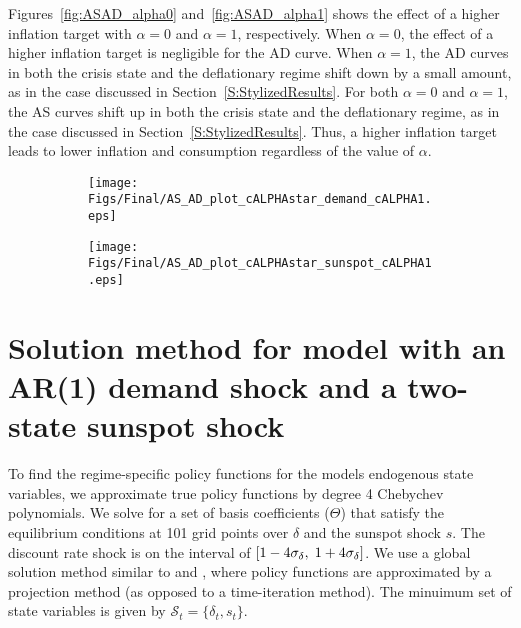\documentclass[11pt]{article}
\begin{document}
\begin{singlespace}
		Figures~\ref{fig:ASAD_alpha0} and~\ref{fig:ASAD_alpha1} shows the effect of a higher inflation target with $\alpha=0$ and $\alpha=1$, respectively. When $\alpha=0$, the effect of a higher inflation target is negligible for the AD curve. When $\alpha=1$, the AD curves in both the crisis state and the deflationary regime shift down by a small amount, as in the case discussed in Section~\ref{S:StylizedResults}. For both $\alpha=0$ and $\alpha=1$, the AS curves shift up in both the crisis state and the deflationary regime, as in the case discussed in Section~\ref{S:StylizedResults}. Thus, a higher inflation target leads to lower inflation and consumption regardless of the value of $\alpha$.
		
		\begin{figure}[h]
			\caption{AD and AS Curves: $\alpha = 1$} \label{fig:ASAD_alpha1}
	        \vspace{-1em}
			\begin{center}
				\begin{subfigure}[b]{0.4\textwidth}
					\centering		        	\texttt{[image: Figs/Final/AS\_AD\_plot\_cALPHAstar\_demand\_cALPHA1.eps]}
				\end{subfigure}
				\hspace{0.5cm}     
				\begin{subfigure}[b]{0.4\textwidth}
					\centering					\texttt{[image: Figs/Final/AS\_AD\_plot\_cALPHAstar\_sunspot\_cALPHA1.eps]}
				\end{subfigure}
			\end{center}
		\end{figure}

		\section{Solution method for model with an AR(1) demand shock and a two-state sunspot shock}
		\label{A:SolutionMethod}

        To find the regime-specific policy functions for the models endogenous state variables, we approximate true policy functions by degree 4 Chebychev polynomials. We solve for a set of basis coefficients ($\Theta$) that satisfy the equilibrium conditions at  101 grid points over $\delta$ and the sunspot shock $s$. The discount rate shock is on the interval of $[1-4\sigma_{\delta}, \hspace{0.1 cm} 1+4\sigma_{\delta}]$. We use a global solution method similar to \citet{Judd1992} and \citet{AruobaCubaBordaSchorfheide2018}, where policy functions are approximated by a projection method (as opposed to a time-iteration method). The minuimum set of state variables is given by $\mathcal{S}_t = \{\delta_t, s_t\}$.
    

\end{singlespace}
\end{document}
